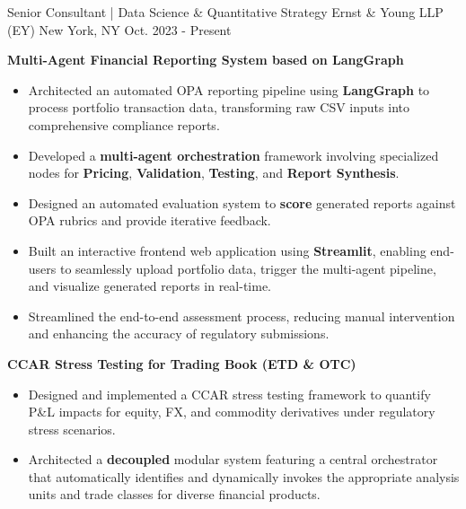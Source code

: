 \vspace{-2.0mm}
\begin{cventries}

\cventry
  {Senior Consultant | Data Science \& Quantitative Strategy}
  {Ernst \& Young LLP (EY)}
  {New York, NY}
  {Oct. 2023 - Present}
  {
    \begin{cvitems}
      \item {\textbf{Multi-Agent Financial Reporting System based on LangGraph}}
        \begin{itemize}
          \item {Architected an automated OPA reporting pipeline using \textbf{LangGraph} to process portfolio transaction data, transforming raw CSV inputs into comprehensive compliance reports.}
          \item {Developed a \textbf{multi-agent orchestration} framework involving specialized nodes for \textbf{Pricing}, \textbf{Validation}, \textbf{Testing}, and \textbf{Report Synthesis}.}
          \item {Designed an automated evaluation system to \textbf{score} generated reports against OPA rubrics and provide iterative feedback.}
          \item {Built an interactive frontend web application using \textbf{Streamlit}, enabling end-users to seamlessly upload portfolio data, trigger the multi-agent pipeline, and visualize generated reports in real-time.}
          \item {Streamlined the end-to-end assessment process, reducing manual intervention and enhancing the accuracy of regulatory submissions.}
        \end{itemize}
      \vspace{0.5mm}
      \item {\textbf{CCAR Stress Testing for Trading Book (ETD \& OTC)}}
        \begin{itemize}
          \item Designed and implemented a CCAR stress testing framework to quantify P\&L impacts for {equity, FX, and commodity} derivatives under regulatory stress scenarios.
          \item Architected a \textbf{decoupled} modular system featuring a central orchestrator that automatically identifies and dynamically invokes the appropriate analysis units and trade classes for diverse financial products.

\end{itemize}
\end{cvitems}}
\end{cventries}
